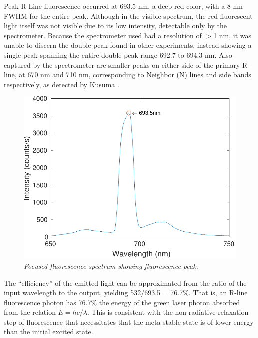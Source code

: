 \documentclass[11pt, a4paper, twocolumn]{article}
\begin{document}
Peak R-Line fluorescence occurred at 693.5 nm, a deep red color, with a 8 nm FWHM for the entire peak. Although in the visible spectrum, the red fluorescent light itself was not visible due to its low intensity, detectable only by the spectrometer. Because the spectrometer used had a resolution of $>$1 nm, it was unable to discern the double peak found in other experiments, instead showing a single peak spanning the entire double peak range 692.7 to 694.3 nm. Also captured by the spectrometer are smaller peaks on either side of the primary R-line, at 670 nm and 710 nm, corresponding to Neighbor (N) lines and side bands respectively, as detected by Kusuma \cite{Kusuma}.
\begin{figure}[]
\includegraphics[width=\linewidth]{fluorescenceSpectrumFocused.pdf}
\caption{\textit{Focused fluorescence spectrum showing fluorescence peak.}}
\label{fig:intensities}
\end{figure}

The “efficiency” of the emitted light can be approximated from the ratio of the input wavelength to the output, yielding 532/693.5 = 76.7\%. That is, an R-line fluorescence photon has 76.7\% the energy of the green laser photon absorbed from the relation $E = hc/\lambda$. This is consistent with the non-radiative relaxation step of fluorescence that necessitates that the meta-stable state is of lower energy than the initial excited state.
\end{document}
